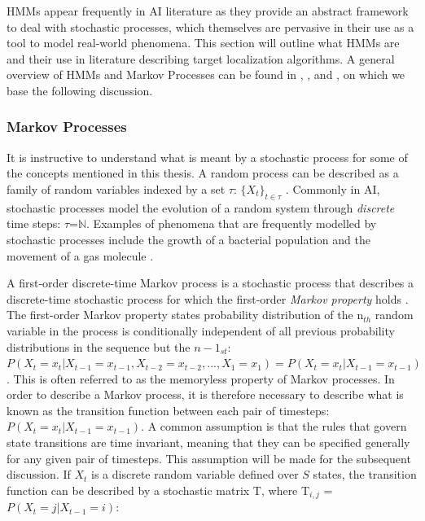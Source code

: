      
HMMs appear frequently in AI literature as they provide an abstract framework to deal with stochastic processes, which themselves are pervasive in their use as a tool to model real-world phenomena. This section will outline what HMMs are and their use in literature describing target localization algorithms. A general overview of HMMs and Markov Processes can be found in \cite{Murphy1994DynamicLearning}, \cite{Ghahramani2001AnNetworks}, \cite{Bhattacharya2009StochasticApplications} and \cite{papoulis02}, on which we base the following discussion.

\subsubsection{Markov Processes}\label{subsubsec:MarkovProcesses}
It is instructive to understand what is meant by a stochastic process for some of the concepts mentioned in this thesis. A random process can be described as a family of random variables indexed by a set $\tau$: $\{X_t\}_{t\in\tau}$ \cite{Bhattacharya2009StochasticApplications}. Commonly in AI, stochastic processes model the evolution of a random system through \textit{discrete} time steps: $\tau$=$\mathbb N$. Examples of phenomena that are frequently modelled by stochastic processes include the growth of a bacterial population and the movement of a gas molecule \cite{Bhattacharya2009StochasticApplications}.\par

A first-order discrete-time Markov process is a stochastic process that describes a discrete-time stochastic process for which the first-order \textit{Markov property} holds \cite{Ghahramani2001AnNetworks}. The first-order Markov property states probability distribution of the n$_{th}$ random variable in the process is conditionally independent of all previous probability distributions in the sequence but the $n-1_{st}$: $P(X_t = x_t | X_{t-1} = x_{t-1}, X_{t-2} = x_{t-2}, ... , X_{1} = x_{1}) = P(X_t = x_t | X_{t-1} = x_{t-1})$ \cite{Ghahramani2001AnNetworks}. This is often referred to as the memoryless property of Markov processes. In order to describe a Markov process, it is therefore necessary to describe what is known as the transition function between each pair of timesteps: $P(X_t = x_t | X_{t-1} = x_{t-1})$. A common assumption is that the rules that govern state transitions are time invariant, meaning that they can be specified generally for any given pair of timesteps. This assumption will be made for the subsequent discussion. If $X_t$ is a discrete random variable defined over $S$ states, the transition function can be described by a stochastic matrix T, where T$_{i,j}$ = $P(X_t = j | X_{t-1} = i)$: 

